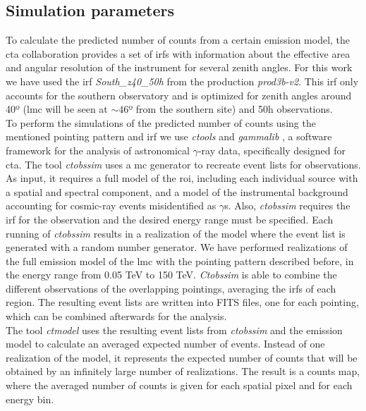 \documentclass{article}
\begin{document}
\subsection{Simulation parameters}

To calculate the predicted number of counts from a certain emission model, the \gls{cta} collaboration provides a set of \glspl{irf} \cite{CTAPerformance} with information about the effective area and angular resolution of the instrument for several zenith angles. For this work we have used the \gls{irf} \textit{South\_z40\_50h} from the production \textit{prod3b-v2}. This \gls{irf} only accounts for the southern observatory and is optimized for zenith angles around 40º (\gls{lmc} will be seen at $\sim 46$º from the southern site) and 50h observations. \\
To perform the simulations of the predicted number of counts using the mentioned pointing pattern and \gls{irf} we use \textit{ctools} and \textit{gammalib} \cite{2016Actools}, a software framework for the analysis of astronomical $\gamma$-ray data, specifically designed for \gls{cta}. The tool \textit{ctobssim} uses a \gls{mc} generator to recreate event lists for observations. As input, it requires a full model of the \gls{roi}, including each individual source with a spatial and spectral component, and a model of the instrumental background accounting for cosmic-ray events misidentified as $\gamma$s.
Also, \textit{ctobssim} requires the \gls{irf} for the observation and the desired energy range must be specified. Each running of \textit{ctobssim} results in a realization of the model where the event list is generated with a random number generator. We have performed realizations of the full emission model of the \gls{lmc} with the pointing pattern described before, in the energy range from 0.05 TeV to 150 TeV. \textit{Ctobssim} is able to combine the different observations of the overlapping pointings, averaging the \glspl{irf} of each region. The resulting event lists are written into FITS files, one for each pointing, which can be combined afterwards for the analysis.\\
The tool \textit{ctmodel} uses the resulting event lists from \textit{ctobssim} and the emission model to calculate an averaged expected number of events. Instead of one realization of the model, it represents the expected number of counts that will be obtained by an infinitely large number of realizations. The result is a counts map, where the averaged number of counts is given for each spatial pixel and for each energy bin.
\end{document}
